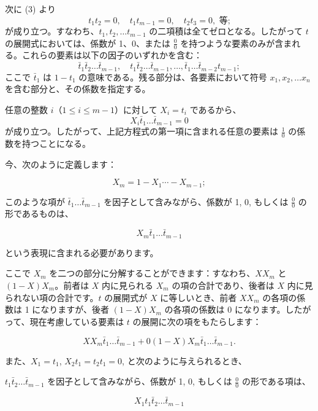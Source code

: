 \documentclass[a4paper,11pt,openany]{ltjsbook}
\begin{document}
次に (3) より
\begin{equation}\tag{5}
t_1 t_2 = 0, \quad t_1 t_{m-1} = 0, \quad t_2 t_3 = 0, \text{ 等;}
\end{equation}
が成り立つ。すなわち、$t_1, t_2, \dotsc t_{m-1}$ の二項積は全てゼロとなる。したがって $t$ の展開式においては、係数が 1、0、または $\displaystyle \frac{0}{0}$ を持つような要素のみが含まれる。これらの要素は以下の因子のいずれかを含む：
\begin{equation}\tag{6}
\bar{t}_1 \bar{t}_2 \dotsc \bar{t}_{m-1}, \quad t_1 \bar{t}_2 \dotsc \bar{t}_{m-1}, \dotsc, \bar{t}_1 \dotsc \bar{t}_{m-2} t_{m-1};
\end{equation}
ここで $\bar{t}_1$ は $1 - t_1$ の意味である。残る部分は、各要素において符号 $x_1, x_2, \dotsc x_n$ を含む部分と、その係数を指定する。

任意の整数 $i$（$1 \leq i \leq m-1$）に対して $X_i = t_i$ であるから、
\begin{equation*}
X_i \bar{t}_1 \dotsc \bar{t}_{m-1} = 0
\end{equation*}
が成り立つ。したがって、上記方程式の第一項に含まれる任意の要素は $\displaystyle \frac{1}{0}$ の係数を持つことになる。

今、次のように定義します：

\[
X_m = 1 - X_1 \dotsm - X_{m-1};
\]

このような項が $\bar{t}_1 \dotsc \bar{t}_{m-1}$ を因子として含みながら、係数が 1, 0, もしくは $\displaystyle \frac{0}{0}$ の形であるものは、

\[
X_m \bar{t}_1 \dotsc \bar{t}_{m-1}
\]

という表現に含まれる必要があります。

ここで $X_m$ を二つの部分に分解することができます：すなわち、$X X_m$ と $(1-X)X_m$。前者は $X$ 内に見られる $X_m$ の項の合計であり、後者は $X$ 内に見られない項の合計です。$t$ の展開式が $X$ に等しいとき、前者 $X X_m$ の各項の係数は 1 になりますが、後者 $(1-X)X_m$ の各項の係数は 0 になります。したがって、現在考慮している要素は $t$ の展開に次の項をもたらします：

\[
X X_m \bar{t}_1 \dotsc \bar{t}_{m-1}
+ 0(1-X)X_m \bar{t}_1 \dotsc \bar{t}_{m-1}.
\]

また、$X_1 = t_1$, $X_2 t_1 = t_2 t_1 = 0$, と次のように与えられるとき、

$t_1 \bar{t}_2 \dotsc \bar{t}_{m-1}$ を因子として含みながら、係数が 1, 0, もしくは $\displaystyle \frac{0}{0}$ の形である項は、

\[
X_1 t_1 \bar{t}_2 \dotsc \bar{t}_{m-1}
\]
\end{document}
